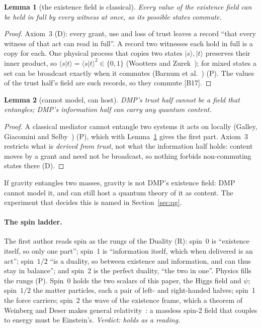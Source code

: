 \documentclass[11pt,a4paper]{article}
\newtheorem{lemma}{Lemma}
\theoremstyle{definition}
\newcommand{\chk}[1]{\textsf{[#1]}}
\newcommand{\tagD}{\textsf{(D)}}
\newcommand{\tagR}{\textsf{(R)}}
\newcommand{\tagP}{\textsf{(P)}}
\begin{document}
\begin{lemma}[the existence field is classical]\label{lem:classical}
Every value of the existence field can be held in full by every witness at once, so its possible states commute.
\end{lemma}

\begin{proof}
Axiom~3 \tagD: every grant, use and loss of trust leaves a record ``that every witness of that act can read in full''. A record two
witnesses each hold in full is a copy for each. One physical process that copies two states $|s\rangle,|t\rangle$ preserves their inner
product, so $\langle s|t\rangle=\langle s|t\rangle^2\in\{0,1\}$ (Wootters and Zurek~\cite{wz}); for mixed states a set can be broadcast
exactly when it commutes (Barnum et al.~\cite{barnum}) \tagP. The values of the trust half's field are such records, so they commute
\chk{B17}.
\end{proof}

\begin{lemma}[cannot model, can host]\label{lem:host}
DMP's trust half cannot be a field that entangles; DMP's information half can carry any quantum content.
\end{lemma}

\begin{proof}
A classical mediator cannot entangle two systems it acts on locally (Galley, Giacomini and Selby~\cite{ggs}) \tagP, which with
Lemma~\ref{lem:classical} gives the first part. Axiom~3 restricts what is \emph{derived from trust}, not what the information half holds:
content moves by a grant and need not be broadcast, so nothing forbids non-commuting states there \tagD.
\end{proof}

\noindent If gravity entangles two masses, gravity is not DMP's existence field: DMP cannot model it, and can still host a quantum theory of
it as content. The experiment that decides this is named in Section~\ref{sec:qg}.

\paragraph{The spin ladder.} The first author reads spin as the rungs of the Duality \tagR: spin~0 is ``existence itself, so only one
part''; spin~1 is ``information itself, which when delivered is an act''; spin~$1/2$ ``is a duality, so between existence and information,
and can thus stay in balance''; and spin~2 is the perfect duality, ``the two in one''. Physics fills the rungs \tagP. Spin~0 holds the two
scalars of this paper, the Higgs field and $\psi$; spin~$1/2$ the matter particles, each a pair of left- and right-handed halves; spin~1 the
force carriers; spin~2 the wave of the existence frame, which a theorem of Weinberg and Deser makes general
relativity~\cite{weinberg64,deser70}: a massless spin-2 field that couples to energy must be Einstein's. \emph{Verdict: holds as a reading.}
\end{document}
